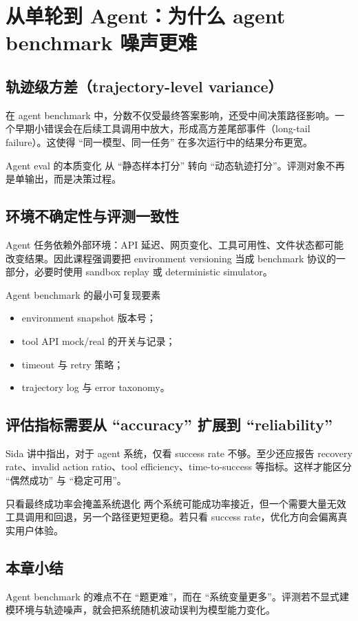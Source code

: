 \section{从单轮到 Agent：为什么 agent benchmark 噪声更难}

\subsection{轨迹级方差（trajectory-level variance）}
在 agent benchmark 中，分数不仅受最终答案影响，还受中间决策路径影响。一个早期小错误会在后续工具调用中放大，形成高方差尾部事件（long-tail failure）。这使得 ``同一模型、同一任务'' 在多次运行中的结果分布更宽。

\begin{importantbox}{Agent eval 的本质变化}
从 ``静态样本打分'' 转向 ``动态轨迹打分''。评测对象不再是单输出，而是决策过程。
\end{importantbox}

\subsection{环境不确定性与评测一致性}
Agent 任务依赖外部环境：API 延迟、网页变化、工具可用性、文件状态都可能改变结果。因此课程强调要把 environment versioning 当成 benchmark 协议的一部分，必要时使用 sandbox replay 或 deterministic simulator。

\begin{knowledgebox}{Agent benchmark 的最小可复现要素}
\begin{itemize}
    \item environment snapshot 版本号；
    \item tool API mock/real 的开关与记录；
    \item timeout 与 retry 策略；
    \item trajectory log 与 error taxonomy。
\end{itemize}
\end{knowledgebox}

\subsection{评估指标需要从 ``accuracy'' 扩展到 ``reliability''}
Sida 讲中指出，对于 agent 系统，仅看 success rate 不够。至少还应报告 recovery rate、invalid action ratio、tool efficiency、time-to-success 等指标。这样才能区分 ``偶然成功'' 与 ``稳定可用''。

\begin{warningbox}{只看最终成功率会掩盖系统退化}
两个系统可能成功率接近，但一个需要大量无效工具调用和回退，另一个路径更短更稳。若只看 success rate，优化方向会偏离真实用户体验。
\end{warningbox}

\subsection{本章小结}
Agent benchmark 的难点不在 ``题更难''，而在 ``系统变量更多''。评测若不显式建模环境与轨迹噪声，就会把系统随机波动误判为模型能力变化。

